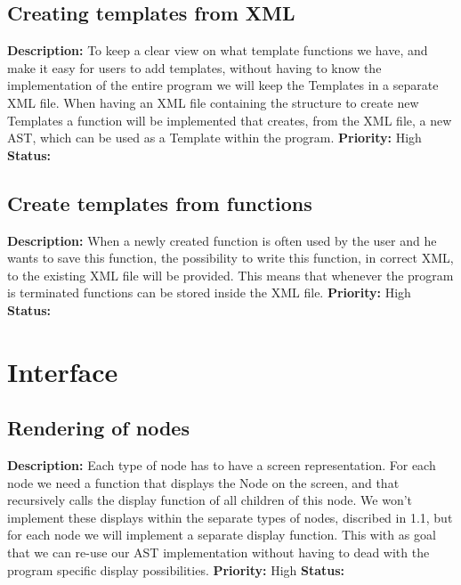 \documentclass{article}
\begin{document}
\subsection{Creating templates from XML}
\textbf{Description: } To keep a clear view on what template functions we have, and make it easy for users to add templates, without having to know the implementation
of the entire program we will keep the Templates in a separate XML file. When having an XML file containing the structure to create new Templates a function will be implemented that creates, from the XML file, a new AST, which 
can be used as a Template within the program.\newline
\textbf{Priority:} High \newline
\textbf{Status: } \newline
\subsection{Create templates from functions}
\textbf{Description: } When a newly created function is often used by the user and he wants to save this function, the possibility to write this function, in correct XML, to
the existing XML file will be provided. This means that whenever the program is terminated functions can be stored inside the XML file.\newline
\textbf{Priority:} High \newline
\textbf{Status: } \newline
\section{Interface}
\subsection{Rendering of nodes}
\textbf{Description: }Each type of node has to have a screen representation. For each node we need a function that displays the Node on the screen, and 
that recursively calls the display function of all children of this node. We won't implement these displays within the separate types of nodes, discribed in 1.1, but 
for each node we will implement a separate display function. This with as goal that we can re-use our AST implementation without having to dead
with the program specific display possibilities.  \newline
\textbf{Priority:} High \newline
\textbf{Status: } \newline
\end{document}
